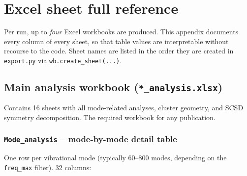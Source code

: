 \documentclass[11pt,a4paper,twoside]{article}
\theoremstyle{remark}
\begin{document}
\section{Excel sheet full reference}
\label{app:sheet-referenz}

Per run, up to \emph{four} Excel workbooks are produced. This
appendix documents every column of every sheet, so that table
values are interpretable without recourse to the code. Sheet names
are listed in the order they are created in \texttt{export.py} via
\texttt{wb.create\_sheet(...)}.

\subsection{Main analysis workbook (\texttt{*\_analysis.xlsx})}
\label{app:wb-hauptauswertung}

Contains 16 sheets with all mode-related analyses, cluster
geometry, and SCSD symmetry decomposition. The required workbook
for any publication.

\subsubsection*{\texttt{Mode\_analysis} -- mode-by-mode detail table}

One row per vibrational mode (typically 60--800 modes, depending
on the \texttt{freq\_max} filter). 32 columns:
\end{document}
